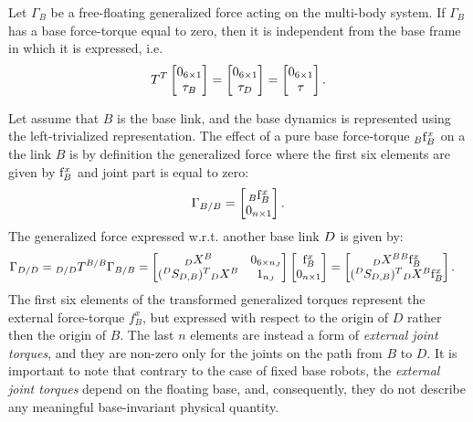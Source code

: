 \begin{remark}
Let $\Gamma_{B}$ be a free-floating generalized force acting on the multi-body system. If $\Gamma_{B}$ has a base force-torque equal to zero, then it is independent from the base frame in which it is expressed, i.e.
\begin{equation*}
T^T
 \begin{bmatrix}
0_{6 \times 1} \\
{\tau}_{B}
\end{bmatrix}
= 
 \begin{bmatrix}
0_{6 \times 1} \\
{\tau}_{D}
\end{bmatrix}
=
 \begin{bmatrix}
0_{6 \times 1} \\
\tau
\end{bmatrix}.
\end{equation*}
\end{remark}

\begin{remark}
Let assume that $B$ is the base link, and the base dynamics is represented using the left-trivialized representation.
The effect of a pure base force-torque $\hspace{0em}_B {\rm f}^x_B$ on a the link $B$ is by definition the generalized force where the first six elements are given by ${\rm f}^x_B$ and joint part is equal to zero:
$$
\Gamma_{B/B} = 
\begin{bmatrix}
\hspace{0em}_B {\rm f}^x_B \\
0_{n\times1} 
\end{bmatrix}.
$$
The generalized force expressed w.r.t. another base link $D$ is given by:  
\begin{align*}
\Gamma_{D/D} &= \hspace{0em}_{D/D}T^{B/B} \Gamma_{B/B} = 
 \begin{bmatrix}
\hspace{0em}_{{D}} X^{{B}} & 0_{6 \times n_J} \\
(\hspace{0em}^D S_{D,B})^{T} \hspace{0em}_{{D}}X^{{B}} & 1_{n_J} 
\end{bmatrix} 
\begin{bmatrix}
{\rm f}^x_B \\
0_{n\times1} 
\end{bmatrix} 
= 
\begin{bmatrix}
\hspace{0em}_{{D}} X^{{B}} \hspace{0em}^B {\rm f}^x_B \\
(\hspace{0em}^D S_{D,B})^{T}  \hspace{0em}_{{D}}X^{{B}} {\rm f}^x_B 
\end{bmatrix} .
\end{align*}
The first six elements of the transformed generalized torques represent the external force-torque $f_B^x$, but expressed with respect to the origin of $D$ rather then the origin of $B$. The last $n$ elements are instead a form of \emph{external joint torques}, and they are non-zero only for the joints on the path from $B$ to $D$. 
It is important to note that contrary to the case of fixed base robots, the \emph{external joint torques} depend on the floating base, and, consequently, they do not describe any meaningful base-invariant physical quantity. 
\end{remark}


